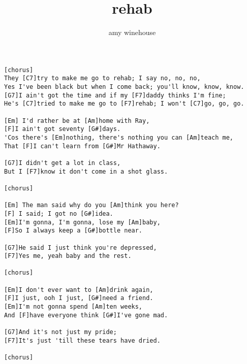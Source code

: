 \author{amy winehouse}
\title{rehab}
\maketitle
\begin{verbatim}
[chorus]
They [C7]try to make me go to rehab; I say no, no, no,
Yes I've been black but when I come back; you'll know, know, know.
[G7]I ain't got the time and if my [F7]daddy thinks I'm fine;
He's [C7]tried to make me go to [F7]rehab; I won't [C7]go, go, go.

[Em] I'd rather be at [Am]home with Ray,
[F]I ain't got seventy [G#]days.
'Cos there's [Em]nothing, there's nothing you can [Am]teach me,
That [F]I can't learn from [G#]Mr Hathaway.

[G7]I didn't get a lot in class,
But I [F7]know it don't come in a shot glass.

[chorus]

[Em] The man said why do you [Am]think you here?
[F] I said; I got no [G#]idea.
[Em]I'm gonna, I'm gonna, lose my [Am]baby,
[F]So I always keep a [G#]bottle near.

[G7]He said I just think you're depressed,
[F7]Yes me, yeah baby and the rest.

[chorus]

[Em]I don't ever want to [Am]drink again,
[F]I just, ooh I just, [G#]need a friend.
[Em]I'm not gonna spend [Am]ten weeks,
And [F]have everyone think [G#]I've gone mad.

[G7]And it's not just my pride;
[F7]It's just 'till these tears have dried.

[chorus]
\end{verbatim}